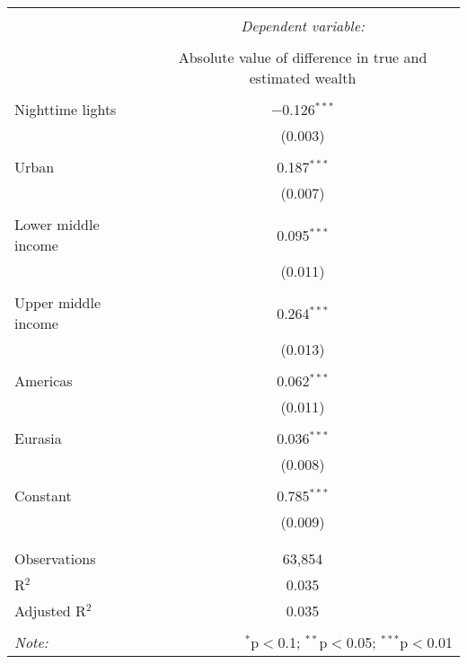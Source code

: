 
\begin{tabular}{@{\extracolsep{5pt}}lc} 
\\[-1.8ex]\hline 
\hline \\[-1.8ex] 
 & \multicolumn{1}{c}{\textit{Dependent variable:}} \\ 
\cline{2-2} 
\\[-1.8ex] & Absolute value of difference in true and estimated wealth \\ 
\hline \\[-1.8ex] 
 Nighttime lights & $-$0.126$^{***}$ \\ 
  & (0.003) \\ 
  & \\ 
 Urban & 0.187$^{***}$ \\ 
  & (0.007) \\ 
  & \\ 
 Lower middle income & 0.095$^{***}$ \\ 
  & (0.011) \\ 
  & \\ 
 Upper middle income & 0.264$^{***}$ \\ 
  & (0.013) \\ 
  & \\ 
 Americas & 0.062$^{***}$ \\ 
  & (0.011) \\ 
  & \\ 
 Eurasia & 0.036$^{***}$ \\ 
  & (0.008) \\ 
  & \\ 
 Constant & 0.785$^{***}$ \\ 
  & (0.009) \\ 
  & \\ 
\hline \\[-1.8ex] 
Observations & 63,854 \\ 
R$^{2}$ & 0.035 \\ 
Adjusted R$^{2}$ & 0.035 \\ 
\hline 
\hline \\[-1.8ex] 
\textit{Note:}  & \multicolumn{1}{r}{$^{*}$p$<$0.1; $^{**}$p$<$0.05; $^{***}$p$<$0.01} \\ 
\end{tabular} 
